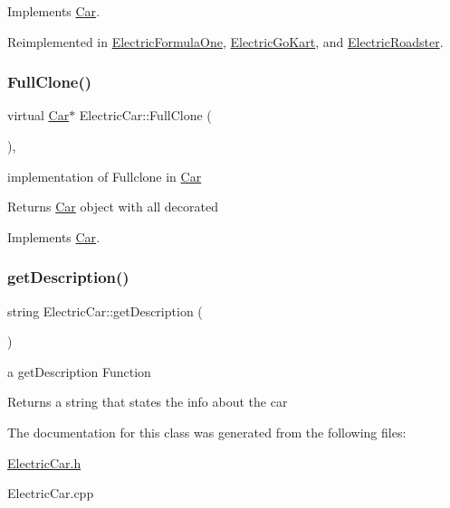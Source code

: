 Implements \mbox{\hyperlink{class_car_a27ad98735fd4a3f675234ea806c227da}{Car}}.



Reimplemented in \mbox{\hyperlink{class_electric_formula_one_ac1649c11b48ceae7a98ccbc0d4727e7c}{Electric\+Formula\+One}}, \mbox{\hyperlink{class_electric_go_kart_a56f6b0c5a68597601f27818f10862bcb}{Electric\+Go\+Kart}}, and \mbox{\hyperlink{class_electric_roadster_a4ef7c42355752e28cd2ad97ed1efc047}{Electric\+Roadster}}.

\mbox{\label{class_electric_car_a97eec3669ad8f20128eaab3084f8f8f5}} 
\subsubsection{\texorpdfstring{Full\+Clone()}{FullClone()}}
{\footnotesize\ttfamily virtual \mbox{\hyperlink{class_car}{Car}}$\ast$ Electric\+Car\+::\+Full\+Clone (\begin{DoxyParamCaption}{ }\end{DoxyParamCaption})\hspace{0.3cm}{\ttfamily [inline]}, {\ttfamily [virtual]}}

implementation of Fullclone in \mbox{\hyperlink{class_car}{Car}} \begin{DoxyReturn}{Returns}
\mbox{\hyperlink{class_car}{Car}} object with all decorated 
\end{DoxyReturn}


Implements \mbox{\hyperlink{class_car_a6e32b3e8ddaaf2b3873c849e42f6a085}{Car}}.

\mbox{\label{class_electric_car_a62d6d62f65e193c0e9f7b79faf2a280f}} 
\subsubsection{\texorpdfstring{get\+Description()}{getDescription()}}
{\footnotesize\ttfamily string Electric\+Car\+::get\+Description (\begin{DoxyParamCaption}{ }\end{DoxyParamCaption})\hspace{0.3cm}{\ttfamily [virtual]}}

a get\+Description Function \begin{DoxyReturn}{Returns}
a string that states the info about the car 
\end{DoxyReturn}


The documentation for this class was generated from the following files\+:\begin{DoxyCompactItemize}
\item 
\mbox{\hyperlink{_electric_car_8h}{Electric\+Car.\+h}}\item 
Electric\+Car.\+cpp\end{DoxyCompactItemize}
